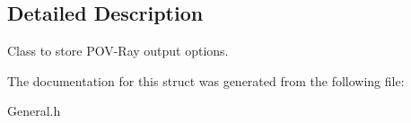 \subsection{Detailed Description}
Class to store P\+O\+V-\/\+Ray output options. 

The documentation for this struct was generated from the following file\+:\begin{DoxyCompactItemize}
\item 
General.\+h\end{DoxyCompactItemize}

